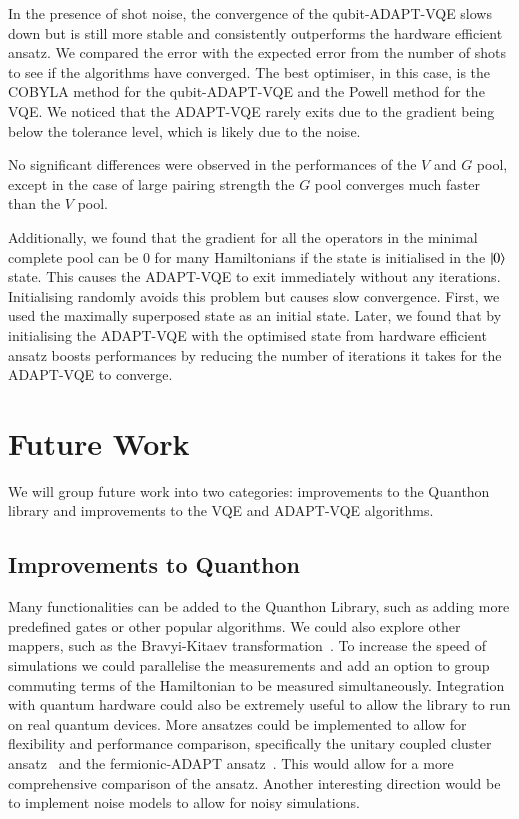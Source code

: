 In the presence of shot noise, the convergence of the qubit-ADAPT-VQE slows down but is still more stable and consistently outperforms the hardware efficient ansatz. We compared the error with the expected error from the number of shots to see if the algorithms have converged. The best optimiser, in this case, is the COBYLA method for the qubit-ADAPT-VQE and the Powell method for the VQE. We noticed that the ADAPT-VQE rarely exits due to the gradient being below the tolerance level, which is likely due to the noise.

No significant differences were observed in the performances of the $ V $ and $ G $ pool, except in the case of large pairing strength the $ G $ pool converges much faster than the $ V $ pool.

Additionally, we found that the gradient for all the operators in the minimal complete pool can be $ 0 $ for many Hamiltonians if the state is initialised in the $ \ket{0} $ state. This causes the ADAPT-VQE to exit immediately without any iterations. Initialising randomly avoids this problem but causes slow convergence. First, we used the maximally superposed state as an initial state. Later, we found that by initialising the ADAPT-VQE with the optimised state from hardware efficient ansatz boosts performances by reducing the number of iterations it takes for the ADAPT-VQE to converge. 

\section{Future Work}

We will group future work into two categories: improvements to the Quanthon library and improvements to the VQE and ADAPT-VQE algorithms.

\subsection{Improvements to Quanthon}
Many functionalities can be added to the Quanthon Library, such as adding more predefined gates or other popular algorithms. We could also explore other mappers, such as the Bravyi-Kitaev transformation~\cite{Seeley2012}. To increase the speed of simulations we could parallelise the measurements and add an option to group commuting terms of the Hamiltonian to be measured simultaneously. Integration with quantum hardware could also be extremely useful to allow the library to run on real quantum devices. More ansatzes could be implemented to allow for flexibility and performance comparison, specifically the unitary coupled cluster ansatz~\cite{Romero2019} and the fermionic-ADAPT ansatz~\cite{grimsley2019}. This would allow for a more comprehensive comparison of the ansatz. Another interesting direction would be to implement noise models to allow for noisy simulations.

